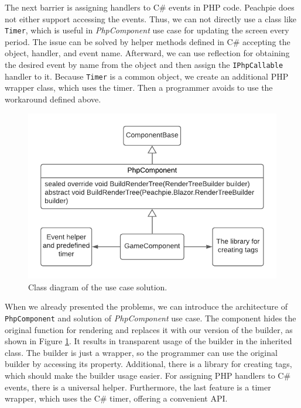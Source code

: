 \par
The next barrier is assigning handlers to C\# events in PHP code.
Peachpie does not either support accessing the events.
Thus, we can not directly use a class like \texttt{Timer}, which is useful in \textit{PhpComponent} use case for updating the screen every period.
The issue can be solved by helper methods defined in C\# accepting the object, handler, and event name.
Afterward, we can use reflection for obtaining the desired event by name from the object and then assign the \texttt{IPhpCallable} handler to it.
Because \texttt{Timer} is a common object, we create an additional PHP wrapper class, which uses the timer.
Then a programmer avoids to use the workaround defined above.
\par
\begin{figure}\centering
\includegraphics[scale=0.8]{./img/PhpComponentSolution}
\caption{Class diagram of the use case solution.}
\label{img17:solution}
\end{figure}
\par
When we already presented the problems, we can introduce the architecture of \texttt{PhpComponent} and solution of \textit{PhpComponent} use case.
The component hides the original function for rendering and replaces it with our version of the builder, as shown in Figure \ref{img17:solution}.
It results in transparent usage of the builder in the inherited class.
The builder is just a wrapper, so the programmer can use the original builder by accessing its property.
Additional, there is a library for creating tags, which should make the builder usage easier.
For assigning PHP handlers to C\# events, there is a universal helper.
Furthermore, the last feature is a timer wrapper, which uses the C\# timer, offering a convenient API.

